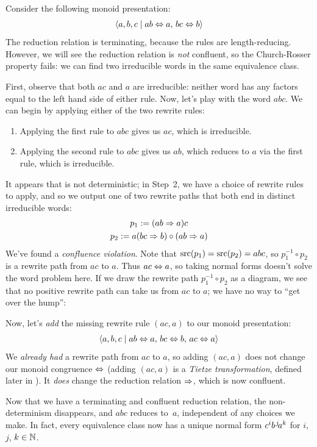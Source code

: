 \documentclass[../generics]{subfiles}
\begin{document}
\begin{example}\label{non confluent example}
Consider the following monoid presentation:
\[\langle a,b,c \mid ab\Leftrightarrow a,\,bc\Leftrightarrow b\rangle\]
The reduction relation is terminating, because the rules are length-reducing. However, we will see the reduction relation is \emph{not} confluent, so the Church-Rosser property fails: we can find two irreducible words in the same equivalence class.

First, observe that both $ac$ and $a$ are irreducible: neither word has any factors equal to the left hand side of either rule. Now, let's play with the word $abc$. We can begin by applying either of the two rewrite rules:
\begin{enumerate}
\item Applying the first rule to $abc$ gives us $ac$, which is irreducible.
\item Applying the second rule to $abc$ gives us $ab$, which reduces to $a$ via the first rule, which is irreducible.
\end{enumerate}
It appears that  is not deterministic; in Step~2, we have a choice of rewrite rules to apply, and so we output one of two rewrite paths that both end in distinct irreducible words:
\begin{gather*}
p_1 := (ab\Rightarrow a)c\\
p_2 := a(bc\Rightarrow b)\circ(ab\Rightarrow a)
\end{gather*}
We've found a \emph{confluence violation}. Note that $\operatorname{src}(p_1)=\operatorname{src}(p_2)=abc$, so $p_1^{-1}\circ p_2$ is a rewrite path from $ac$ to $a$. Thus $ac\Leftrightarrow a$, so taking normal forms doesn't solve the word problem here. If we draw the rewrite path $p_1^{-1}\circ p_2$ as a diagram, we see that no positive rewrite path can take us from $ac$ to $a$; we have no way to ``get over the hump'':
\begin{center}
\end{center}

Now, let's \emph{add} the missing rewrite rule $(ac,a)$ to our monoid presentation:
\[\langle a,b,c \mid ab\Leftrightarrow a,\,bc\Leftrightarrow b,\,ac\Leftrightarrow a\rangle\]
We \emph{already had} a rewrite path from $ac$ to $a$, so adding $(ac, a)$ does not change our monoid congruence $\Leftrightarrow$ (adding $(ac, a)$ is a \emph{Tietze transformation}, defined later in ). It \emph{does} change the reduction relation $\Rightarrow$, which is now confluent.

Now that we have a terminating and confluent reduction relation, the non-determinism disappears, and $abc$ reduces to~$a$, independent of any choices we make. In fact, every equivalence class now has a unique normal form $c^i b^{\hspace{0.08em}j}\! a^k$ for $i$, $j$, $k\in\mathbb{N}$.
\end{example}
\end{document}
